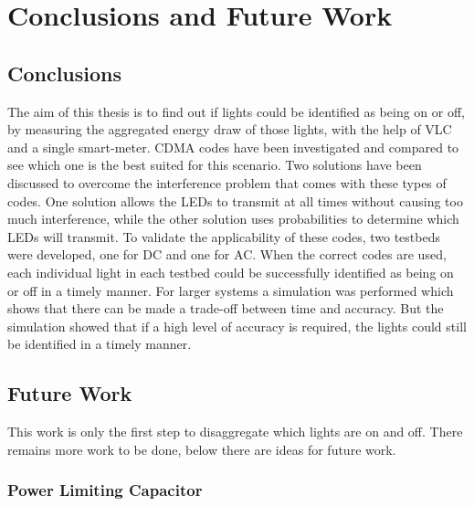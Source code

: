 
\chapter{Conclusions and Future Work}
\label{chp:conclusionsandfuturework}

	\section{Conclusions}


	The aim of this thesis is to find out if lights could be identified as being on or off, by measuring the aggregated energy draw of those lights, with the help of VLC and a single smart-meter.
	CDMA codes have been investigated and compared to see which one is the best suited for this scenario.
	Two solutions have been discussed to overcome the interference problem that comes with these types of codes.
	One solution allows the LEDs to transmit at all times without causing too much interference, while the other solution uses probabilities to determine which LEDs will transmit.
	To validate the applicability of these codes, two testbeds were developed, one for DC and one for AC.
	When the correct codes are used, each individual light in each testbed could be successfully identified as being on or off in a timely manner.
	For larger systems a simulation was performed which shows that there can be made a trade-off between time and accuracy. 
	But the simulation showed that if a high level of accuracy is required, the lights could still be identified in a timely manner.






\section{Future Work}


This work is only the first step to disaggregate which lights are on and off.
There remains more work to be done, below there are ideas for future work.

	\subsection{Power Limiting Capacitor}

